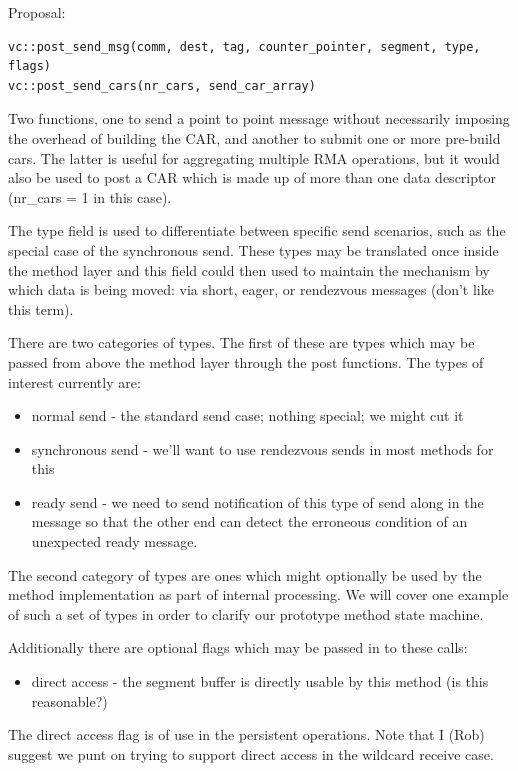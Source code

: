 \documentclass[11pt,letterpaper]{article}
\begin{document}
Proposal:
\begin{verbatim}
vc::post_send_msg(comm, dest, tag, counter_pointer, segment, type, flags)
vc::post_send_cars(nr_cars, send_car_array)
\end{verbatim}
Two functions, one to send a point to point message without necessarily
imposing the overhead of building the CAR, and another to submit one or more
pre-build cars.  The latter is useful for aggregating multiple RMA operations,
but it would also be used to post a CAR which is made up of more than one data
descriptor (nr\_cars = 1 in this case).

The type field is used to differentiate between specific send scenarios, such
as the special case of the synchronous send.  These types may be translated
once inside the method layer and this field could then used to maintain the
mechanism by which data is being moved: via short, eager, or rendezvous
messages (don't like this term).

There are two categories of types.  The first of these are types which may be
passed from above the method layer through the post functions.  The types of
interest currently are:
\begin{itemize}
\item normal send - the standard send case; nothing special; we might cut it
\item synchronous send - we'll want to use rendezvous sends in most methods for
  this
\item ready send - we need to send notification of this type of send along in
  the message so that the other end can detect the erroneous condition of an
  unexpected ready message.
\end{itemize}

The second category of types are ones which might optionally be used by the
method implementation as part of internal processing.  We will cover one
example of such a set of types in order to clarify our prototype method state
machine.

Additionally there are optional flags which may be passed in to these calls:
\begin{itemize}
\item direct access - the segment buffer is directly usable by this method (is
  this reasonable?)
\end{itemize}

The direct access flag is of use in the persistent operations.  Note that I
(Rob) suggest we punt on trying to support direct access in the wildcard
receive case.
\end{document}
